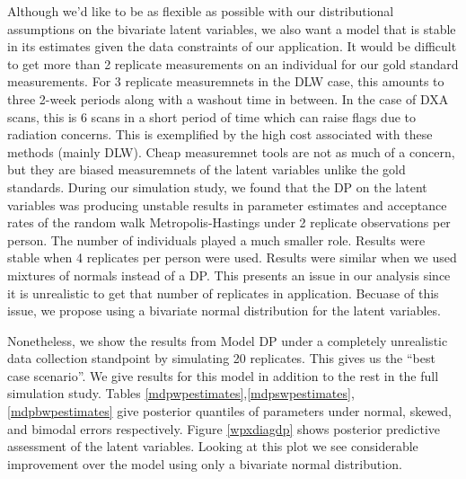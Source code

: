 \documentclass[11pt]{article}\usepackage[]{graphicx}\usepackage[]{color}
\begin{document}

Although we'd like to be as flexible as possible with our distributional assumptions on the bivariate latent variables, we also want a model that is stable in its estimates given the data constraints of our application. It would be difficult to get more than 2 replicate measurements on an individual for our gold standard measurements. For 3 replicate measuremnets in the DLW case, this amounts to three 2-week periods along with a washout time in between. In the case of DXA scans, this is 6 scans in a short period of time which can raise flags due to radiation concerns. This is exemplified by the high cost associated with these methods (mainly DLW). Cheap measuremnet tools are not as much of a concern, but they are biased measuremnets of the latent variables unlike the gold standards. During our simulation study, we found that the DP on the latent variables was producing unstable results in parameter estimates and acceptance rates of the random walk Metropolis-Hastings under 2 replicate observations per person. The number of individuals played a much smaller role. Results were stable when 4 replicates per person were used. Results were similar when we used mixtures of normals instead of a DP. This presents an issue in our analysis since it is unrealistic to get that number of replicates in application. Becuase of this issue, we propose using a bivariate normal distribution for the latent variables. 

Nonetheless, we show the results from Model DP under a completely unrealistic data collection standpoint by simulating 20 replicates. This gives us the ``best case scenario''. We give results for this model in addition to the rest in the full simulation study. Tables \ref{mdpwpestimates},\ref{mdpswpestimates},\ref{mdpbwpestimates} give posterior quantiles of parameters under normal, skewed, and bimodal errors respectively. Figure \ref{wpxdiagdp} shows posterior predictive assessment of the latent variables. Looking at this plot we see considerable improvement over the model using only a bivariate normal distribution. 
\end{document}

